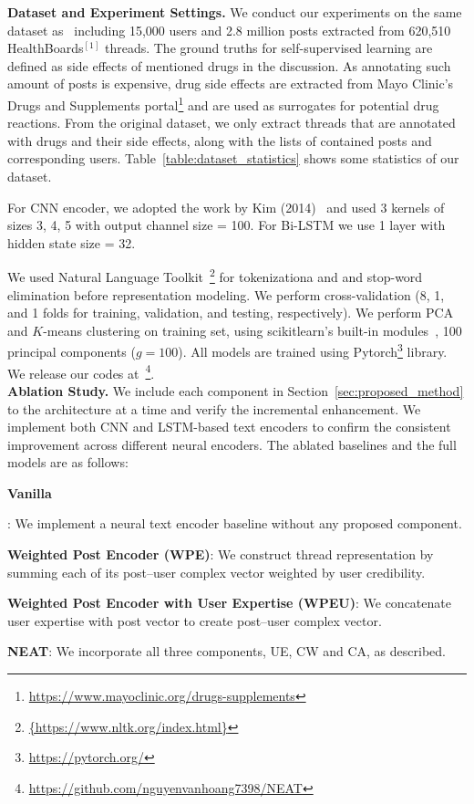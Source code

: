 \documentclass{bmcart}
\begin{document}
{\bf Dataset and Experiment Settings.} We conduct our experiments on the same dataset as~\cite{mukherjee2014people} including 15,000 users and 2.8 million posts extracted from 620,510 HealthBoards$^{[1]}$ threads. The ground truths for self-supervised learning are defined as side effects of mentioned drugs in the discussion. As annotating such amount of posts is expensive, drug side effects are extracted from Mayo Clinic's Drugs and Supplements portal\footnote{\scriptsize{\url{https://www.mayoclinic.org/drugs-supplements}}} and are used as surrogates for potential drug reactions. From the original dataset, we only extract threads that are annotated with drugs and their side effects, along with the lists of contained posts and corresponding users. Table~\ref{table:dataset_statistics} shows 
some statistics of our dataset. 

For CNN encoder, we adopted the work by Kim (2014)~\cite{kim2014convolutional} and used 3 kernels of sizes 3, 4, 5 with output channel size = 100. For Bi-LSTM we use 1 layer with hidden state size = 32.

We used Natural Language Toolkit~\footnote{\scriptsize{\url{{https://www.nltk.org/index.html}}}} for tokenizationa and and stop-word elimination before representation modeling. 
We perform cross-validation (8, 1, and 1 folds for training, validation, and testing, respectively). We perform PCA and $K$-means clustering on training set, using scikitlearn's built-in modules~\cite{scikit-learn}, 
100 principal components ($g=100$). All models are trained using Pytorch\footnote{\scriptsize{\url{https://pytorch.org/}}} library. We release our codes at~\footnote{\scriptsize{\url{https://github.com/nguyenvanhoang7398/NEAT}}}. \\

{\bf Ablation Study.} We include each component in Section~\ref{sec:proposed_method} to the architecture at a time and verify the incremental enhancement. We implement both CNN and LSTM-based text encoders to confirm the consistent improvement across different neural encoders. The ablated baselines and the full models are as follows: 

\begin{itemize}
  {\item{\textbf{Vanilla}}}: We implement a neural text encoder baseline without any proposed component.
  
\item{\textbf{Weighted Post Encoder (WPE)}}: We construct thread representation by summing each of its post--user complex vector weighted by user credibility.

\item{\textbf{Weighted Post Encoder with User Expertise (WPEU)}}: We concatenate user expertise with post vector to create post--user complex vector.

\item{\textbf{NEAT}}: We incorporate all three components, UE, CW and CA, as described.

\end{itemize}
\end{document}
